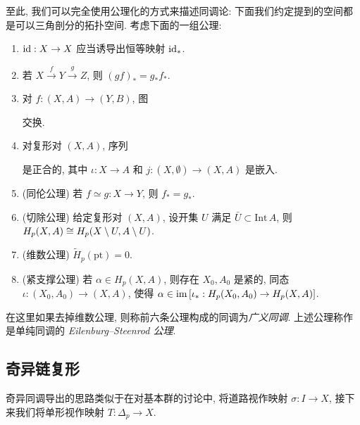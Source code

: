 至此, 我们可以完全使用公理化的方式来描述同调论: 下面我们约定提到的空间都是可以三角剖分的拓扑空间. 考虑下面的一组公理:
\begin{enumerate}
	\item $ \mathrm{id} : X\to X $ 应当诱导出恒等映射 $ \mathrm{id}_* $.
	\item 若 $ X\stackrel{f}{\to} Y\stackrel{g}{\to} Z $, 则 $ (gf)_*=g_*f_* $.
	\item 对 $ f : (X,A)\to (Y,B) $, 图
	\begin{center}
	\end{center}
	交换.
	\item 对复形对 $ (X,A) $, 序列
	\begin{center}
	\end{center}
	是正合的, 其中 $ \iota : X\to A $ 和 $ j : (X,\emptyset)\to(X,A) $ 是嵌入.
	\item (同伦公理) 若 $ f\simeq g : X\to Y $, 则 $ f_*=g_* $.
	\item (切除公理) 给定复形对 $ (X,A) $, 设开集 $ U $ 满足 $ \bar{U}\subset\mathrm{Int}\,A $, 则 $ H_p(X,A)\cong H_p(X\setminus U,A\setminus U) $.
	\item (维数公理) $ \tilde{H}_p(\mathrm{pt})=0 $.
	\item (紧支撑公理) 若 $ \alpha\in H_p(X,A) $, 则存在 $ X_0,A_0 $ 是紧的, 同态 $ \iota : (X_0,A_0)\to (X,A) $, 使得 $ \alpha\in\mathrm{im}\,[\iota_* : H_p(X_0,A_0)\to H_p(X,A)] $.
\end{enumerate}

在这里如果去掉维数公理, 则称前六条公理构成的同调为\emph{广义同调}. 上述公理称作是单纯同调的 \emph{Eilenburg--Steenrod 公理}.

\subsection{奇异链复形}

奇异同调导出的思路类似于在对基本群的讨论中, 将道路视作映射 $ \sigma : I\to X $, 接下来我们将单形视作映射 $ T : \Delta_p\to X $.


